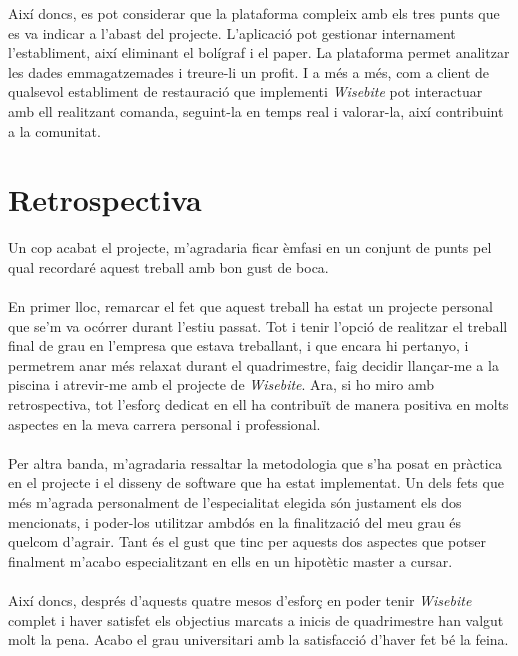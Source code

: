\noindent Així doncs, es pot considerar que la plataforma compleix amb els tres punts que es va indicar a l'abast del projecte. L'aplicació pot gestionar internament l'establiment, així eliminant el bolígraf i el paper. La plataforma permet analitzar les dades emmagatzemades i treure-li un profit. I a més a més, com a client de qualsevol establiment de restauració que implementi \textit{Wisebite} pot interactuar amb ell realitzant comanda, seguint-la en temps real i valorar-la, així contribuint a la comunitat.


\section{Retrospectiva}

Un cop acabat el projecte, m'agradaria ficar èmfasi en un conjunt de punts pel qual recordaré aquest treball amb bon gust de boca.
\\\\
En primer lloc, remarcar el fet que aquest treball ha estat un projecte personal que se'm va ocórrer durant l'estiu passat. Tot i tenir l'opció de realitzar el treball final de grau en l'empresa que estava treballant, i que encara hi pertanyo, i permetrem anar més relaxat durant el quadrimestre, faig decidir llançar-me a la piscina i atrevir-me amb el projecte de \textit{Wisebite}. Ara, si ho miro amb retrospectiva, tot l'esforç dedicat en ell ha contribuït de manera positiva en molts aspectes en la meva carrera personal i professional.
\\\\
Per altra banda, m'agradaria ressaltar la metodologia que s'ha posat en pràctica en el projecte i el disseny de software que ha estat implementat. Un dels fets que més m'agrada personalment de l'especialitat elegida són justament els dos mencionats, i poder-los utilitzar ambdós en la finalització del meu grau és quelcom d'agrair. Tant és el gust que tinc per aquests dos aspectes que potser finalment m'acabo especialitzant en ells en un hipotètic master a cursar.
\\\\
Així doncs, després d'aquests quatre mesos d'esforç en poder tenir \textit{Wisebite} complet i haver satisfet els objectius marcats a inicis de quadrimestre han valgut molt la pena. Acabo el grau universitari amb la satisfacció d'haver fet bé la feina.

